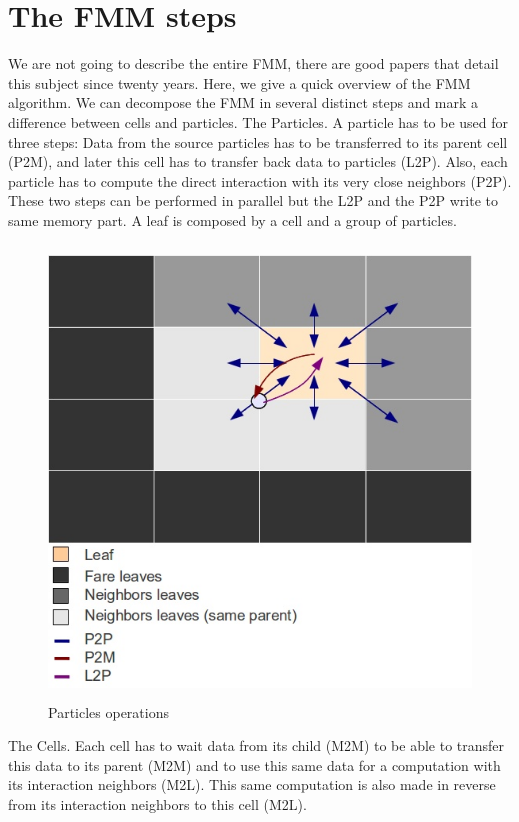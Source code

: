 \documentclass[12pt,letterpaper,titlepage]{report}
\begin{document}
\section{The FMM steps}
We are not going to describe the entire FMM, there are good papers that detail this subject since twenty years. Here, we give a quick overview of the FMM algorithm.
We can decompose the FMM in several distinct steps and mark a difference between cells and particles.
The Particles.
A particle has to be used for three steps:
Data from the source particles has to be transferred to its parent cell (P2M), and later this cell has to transfer back data to particles (L2P).
Also, each particle has to compute the direct interaction with its very close neighbors (P2P).
These two steps can be performed in parallel but the L2P and the P2P write to same memory part.
A leaf is composed by a cell and a group of particles.
\begin{figure}[h!]
\begin{center}
\includegraphics[width=12cm, height=12cm, keepaspectratio=true]{particles.jpg}
\caption{Particles operations}
\end{center}
\end{figure}
The Cells.
Each cell has to wait data from its child (M2M) to be able to transfer this data to its parent (M2M) and to use this same data for a computation with its interaction neighbors (M2L).
This same computation is also made in reverse from its interaction neighbors to this cell (M2L).
\end{document}
